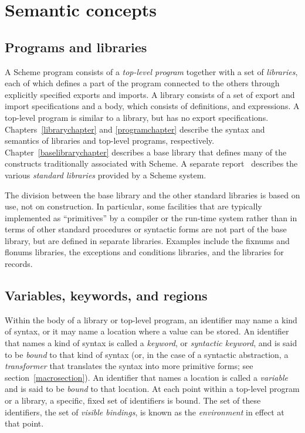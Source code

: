 \chapter{Semantic concepts}
\label{basicchapter}

\section{Programs and libraries}

A Scheme program consists of a \textit{top-level program}
together with a set of \textit{libraries}, each
of which defines a part of the program connected to the others through
explicitly specified exports and imports.  A library consists of a set
of export and import specifications and a body, which consists of
definitions, and expressions.
A top-level program is similar to a library, but
has no export specifications.
Chapters~\ref{librarychapter} and \ref{programchapter}
describe the syntax and semantics of libraries and top-level programs,
respectively. 
Chapter~\ref{baselibrarychapter} describes a base
library that defines many of the constructs traditionally associated with
Scheme.
A separate report~\cite{R6RS-libraries}
describes the various \textit{standard libraries} provided by a Scheme system.

The division between the base library and the other standard libraries is
based on use, not on construction.  In particular, some facilities
that are typically implemented as ``primitives'' by a compiler or the
run-time system rather than in terms of other standard procedures
 or syntactic forms are not part of the base library, but are defined in
separate libraries.  Examples include the fixnums and flonums libraries,
the exceptions and conditions libraries, and the libraries for
records.

\section{Variables, keywords, and regions}
\label{specialformsection}
\label{variablesection}

Within the body of a library or top-level program,
an identifier may name a kind of syntax, or it may name
a location where a value can be stored.  An identifier that names a kind
of syntax is called a {\em keyword}, or {\em syntactic keyword},
and is said to be {\em bound} to that kind of syntax (or, in the case of a
syntactic abstraction, a {\em transformer} that translates the syntax into more
primitive forms; see section~\ref{macrosection}).  An identifier that names a
location is called a {\em variable} and is said to be
{\em bound} to that location.  
At each point within a top-level program or a library, a specific, fixed set
of identifiers is bound.  The set of these identifiers, the set of \textit{visible
bindings}, is
known as the {\em environment} in effect at that point.

